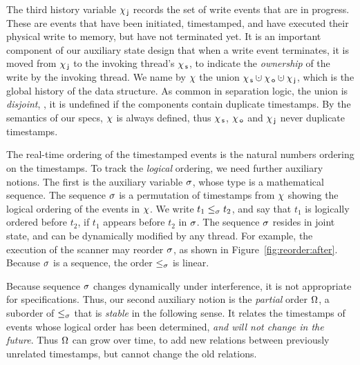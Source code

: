 The third history variable $\chi_{\, \mathsf{j}}$ records the set of write events
that are in progress. These are events that have been initiated,
timestamped, and have executed their physical write to memory, but
have not terminated yet. It is an important component of our auxiliary
state design that when a write event terminates, it is moved from
$\chi_{\, \mathsf{j}}$ to the invoking thread's $\chi_{\, \mathsf{s}}$, to indicate the
\emph{ownership} of the write by the invoking thread.
%
We name by $\chi$ the union $\histS \hunion \histO \hunion \histJ$,
which is the global history of the data structure. As common in
separation logic, the union is \emph{disjoint}, \ie, it is undefined
if the components contain duplicate timestamps. By the semantics of
our specs, $\chi$ is always defined, thus $\chi_{\, \mathsf{s}}$, $\chi_{\, \mathsf{o}}$ and
$\chi_{\, \mathsf{j}}$ never duplicate timestamps.

The real-time ordering of the timestamped events is the natural
numbers ordering on the timestamps. To track the \emph{logical}
ordering, we need further auxiliary notions.
%
The first is the auxiliary variable $\sigma$, whose type is a
mathematical sequence. The sequence $\sigma$ is a permutation of
timestamps from $\chi$ showing the logical ordering of the events in
$\chi$. We write $t_1 \mathrel{\leq_\sigma} t_2$, and say that $t_1$ is logically
ordered before $t_2$, if $t_1$ appears before $t_2$ in $\sigma$. The
sequence $\sigma$ resides in joint state, and can be dynamically
modified by any thread. For example, the execution of the scanner may
reorder $\sigma$, as shown in
Figure~\ref{fig:reorder:after}. Because $\sigma$ is a sequence, the
order $\mathrel{\leq_\sigma}$ is linear.

%
%

Because sequence $\sigma$ changes dynamically under interference, it
is not appropriate for specifications. Thus, our second auxiliary
notion is the \emph{partial} order $\Omega$, a suborder of
$\mathrel{\leq_\sigma}$ that is \emph{stable} in the following sense. It relates the
timestamps of events whose logical order has been determined,
\emph{and will not change in the future}. Thus $\Omega$ can grow
over time, to add new relations between previously unrelated
timestamps, but cannot change the old relations.

%

